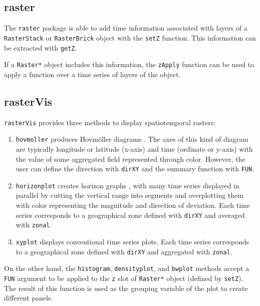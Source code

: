 \documentclass[smallroyalvopaper]{memoir}
\begin{document}
\subsection{raster}
\label{sec:orgheadline39}
\label{sec:rasterST}

The \texttt{raster} package \cite{Hijmans2013} is able to add time information associated with layers of a \texttt{RasterStack} or \texttt{RasterBrick} object with the \texttt{setZ} function. This information can be extracted with \texttt{getZ}.

If a \texttt{Raster*} object includes this information, the \texttt{zApply} function can be used to apply a function over a time series of layers of the object.

\subsection{rasterVis}
\label{sec:orgheadline40}
\label{sec:rastervisST}

\texttt{rasterVis} \cite{Perpinan.Hijmans2013} provides three methods to display spatiotemporal rasters:

\begin{enumerate}
\item \texttt{hovmoller} produces Hovmöller diagrams \cite{Hovmoeller1949a}. The axes of this kind of diagram are typically longitude or latitude (x-axis) and time (ordinate or y-axis) with the value of some aggregated field represented through color. However, the user can define the direction with \texttt{dirXY} and the summary function with \texttt{FUN}.

\item \texttt{horizonplot} creates horizon graphs \cite{Few2008}, with many time series displayed in parallel by cutting the vertical range into segments and overplotting them with color representing the magnitude and direction of deviation. Each time series corresponds to a geographical zone defined with \texttt{dirXY} and averaged with \texttt{zonal}.

\item \texttt{xyplot} displays conventional time series plots. Each time series corresponds to a geographical zone defined with \texttt{dirXY} and aggregated with \texttt{zonal}.
\end{enumerate}

On the other hand, the \texttt{histogram}, \texttt{densityplot}, and \texttt{bwplot} methods accept a \texttt{FUN} argument to be applied to the \texttt{z} slot of \texttt{Raster*} object (defined by \texttt{setZ}). The result of this function is used as the grouping variable of the plot to create different panels.
\end{document}
